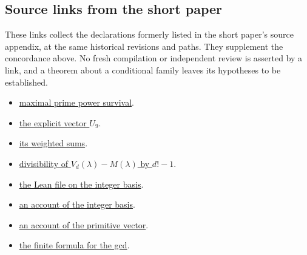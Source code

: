 \documentclass[11pt]{article}
\begin{document}
\subsection{Source links from the short paper}\label{long68:sec:short-concordance}

These links collect the declarations formerly listed in the short
paper's source appendix, at the same historical revisions and paths.
They supplement the concordance above. No fresh compilation or
independent review is asserted by a link, and a theorem about a
conditional family leaves its hypotheses to be established.

\begingroup\small\raggedright
\begin{itemize}[leftmargin=*]
\item \href{https://github.com/wcook04/plectis-erdos/blob/f36a98bf3d3e6f65f1074e3b800e3293d5b8a51a/ErdosProblems/Erdos68/PaperCompletePrimePole.lean#L118}{maximal prime power survival}.
\item \href{https://github.com/wcook04/plectis-erdos/blob/f36a98bf3d3e6f65f1074e3b800e3293d5b8a51a/ErdosProblems/Erdos68/PaperCompleteSupplementary.lean#L17}{the explicit vector $U_9$}.
\item \href{https://github.com/wcook04/plectis-erdos/blob/f36a98bf3d3e6f65f1074e3b800e3293d5b8a51a/ErdosProblems/Erdos68/PaperCompleteSupplementary.lean#L45}{its weighted sums}.
\item \href{https://github.com/wcook04/plectis-erdos/blob/f36a98bf3d3e6f65f1074e3b800e3293d5b8a51a/ErdosProblems/Erdos68/PaperCompleteSupplementary.lean#L53}{divisibility of $V_d(\lambda)-M(\lambda)$ by $d!-1$}.
\item \href{https://github.com/wcook04/plectis-erdos/blob/f36a98bf3d3e6f65f1074e3b800e3293d5b8a51a/ErdosProblems/Erdos68/DivisorChannelBasis.lean}{the Lean file on the integer basis}.
\item \href{https://github.com/wcook04/plectis-erdos/blob/f36a98bf3d3e6f65f1074e3b800e3293d5b8a51a/ErdosProblems/Erdos68/DivisorChannelBasis.md}{an account of the integer basis}.
\item \href{https://github.com/wcook04/plectis-erdos/blob/f36a98bf3d3e6f65f1074e3b800e3293d5b8a51a/ErdosProblems/Erdos68/CompressedPrimitiveChannelKernel.md}{an account of the primitive vector}.
\item \href{https://github.com/wcook04/plectis-erdos/blob/f36a98bf3d3e6f65f1074e3b800e3293d5b8a51a/ErdosProblems/Erdos68/PaperCompleteMomentHorizon.lean}{the finite formula for the gcd}.

\end{itemize}
\end{document}

